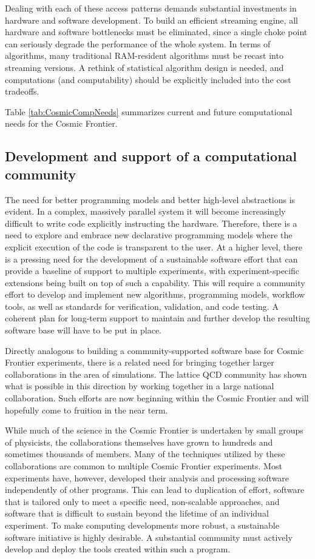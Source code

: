 Dealing with each of these access patterns demands substantial
investments in hardware and software development. To build an
efficient streaming engine, all hardware and software bottlenecks must
be eliminated, since a single choke point can seriously degrade the
performance of the whole system. In terms of algorithms, many
traditional RAM-resident algorithms must be recast into streaming
versions. A rethink of statistical algorithm design is needed, and
computations (and computability) should be explicitly included into
the cost tradeoffs.

Table \ref{tab:CosmicCompNeeds} summarizes current and future
computational needs for the Cosmic Frontier.

\subsection{Development and support of a computational community}
The need for better programming models and better high-level
abstractions is evident. In a complex, massively parallel system it
will become increasingly difficult to write code explicitly
instructing the hardware. Therefore, there is a need to explore and
embrace new declarative programming models where the explicit
execution of the code is transparent to the user. At a higher level,
there is a pressing need for the development of a sustainable software
effort that can provide a baseline of support to multiple experiments,
with experiment-specific extensions being built on top of such a
capability. This will require a community effort to develop and
implement new algorithms, programming models, workflow tools, as well
as standards for verification, validation, and code testing. A
coherent plan for long-term support to maintain and further develop
the resulting software base will have to be put in place.

Directly analogous to building a community-supported software base for
Cosmic Frontier experiments, there is a related need for bringing
together larger collaborations in the area of simulations. The lattice
QCD community has shown what is possible in this direction by working
together in a large national collaboration. Such efforts are now
beginning within the Cosmic Frontier and will hopefully come to
fruition in the near term.

While much of the science in the Cosmic Frontier is undertaken by
small groups of physicists, the collaborations themselves have grown
to hundreds and sometimes thousands of members. Many of the techniques
utilized by these collaborations are common to multiple Cosmic
Frontier experiments. Most experiments have, however, developed their
analysis and processing software independently of other programs. This
can lead to duplication of effort, software that is tailored only to
meet a specific need, non-scalable approaches, and software that is
difficult to sustain beyond the lifetime of an individual
experiment. To make computing developments more robust, a sustainable
software initiative is highly desirable. A substantial community must actively
develop and deploy the tools created within such a program.

